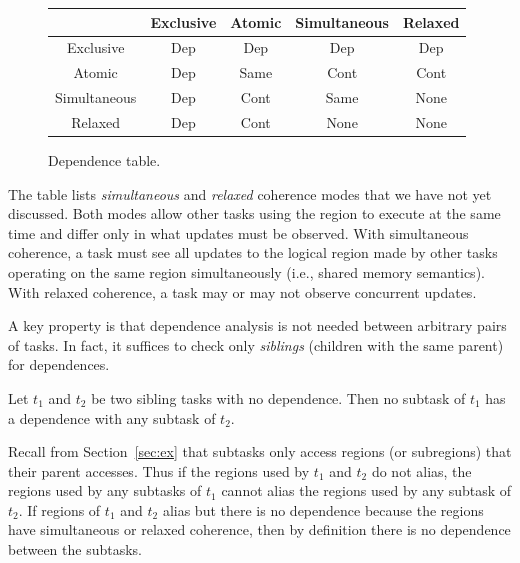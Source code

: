 \begin{figure}
{\small
\begin{tabular}{c|cccc}
             & Exclusive & Atomic   & Simultaneous & Relaxed \\
\midrule
Exclusive    & Dep & Dep & Dep & Dep \\ 
Atomic       & Dep & Same & Cont & Cont \\
Simultaneous & Dep & Cont & Same & None \\
Relaxed      & Dep & Cont & None & None \\
\end{tabular}
}
\caption{Dependence table.}
\label{fig:dependence}
\end{figure}

The table lists {\em simultaneous} and {\em relaxed} coherence modes
that we have not yet discussed.  Both modes
allow other tasks using the region to execute at the same time and differ
only in what updates must be observed.  With simultaneous coherence, a task must 
see all updates to the logical region made by other tasks operating on the same region 
simultaneously (i.e., shared memory semantics).  With relaxed coherence, 
a task may or may not observe concurrent updates.


%
%
%
%
%
%
%

A key property is that dependence analysis is not needed between arbitrary pairs of tasks.
In fact, it suffices to check only  {\em siblings} (children with the same parent) for dependences.
\begin{observation}
\label{obs:isolation}
\rm
Let $t_1$ and $t_2$ be two sibling tasks with no dependence.  Then no subtask of $t_1$ has a dependence with any subtask
of $t_2$.
\end{observation}
Recall from Section~\ref{sec:ex} that subtasks only access regions (or subregions) that their parent accesses.  
Thus if the regions used by $t_1$ and $t_2$ do not alias, the regions used by any subtasks of $t_1$ cannot
alias the regions used by any subtask of $t_2$.  If regions of $t_1$ and $t_2$ alias
but there is no dependence because the regions have simultaneous or relaxed coherence, then by definition there is no dependence between the subtasks.

